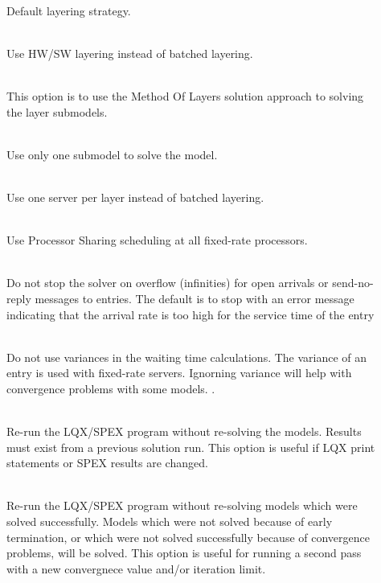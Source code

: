 \begin{description}
\item[]~\\
Default layering strategy.
\item[]~\\
Use HW/SW layering instead of batched layering.
\item[]~\\
This option is to use the Method Of Layers solution approach to solving the layer submodels.
\item[]~\\
Use only one submodel to solve the model.
\item[]~\\
Use one server per layer instead of batched layering.
\item[]~\\
Use Processor Sharing scheduling at all fixed-rate processors.
\item[]~\\
Do not stop the solver on overflow (infinities) for open arrivals or send-no-reply messages to entries.  The default is to stop with an
error message indicating that the arrival rate is too high for the service time of the entry
\item[]~\\
Do not use variances in the waiting time calculations.
The variance of an entry is used with fixed-rate servers.
Ignorning variance will help with convergence problems with some models. .
\item[]~\\
Re-run the LQX/SPEX program without re-solving the models.  Results must exist from a previous solution run.
This option is useful if LQX print statements or SPEX results are changed.
\item[]~\\
Re-run the LQX/SPEX program without re-solving models which were solved successfully.  Models which were not solved because of early termination, or which were not solved successfully because of convergence problems, will be solved.
This option is useful for running a second pass with a new convergnece value and/or iteration limit.
\item[]~\\

\end{description}
